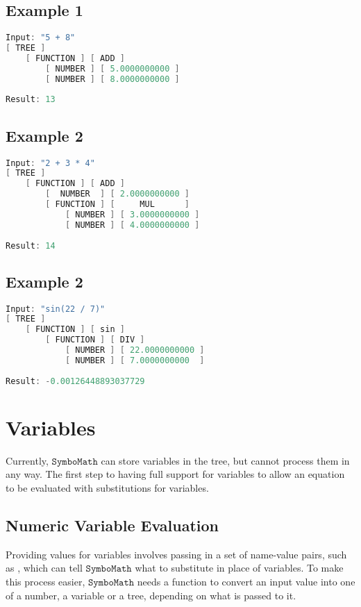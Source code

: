 \documentclass[12pt]{article}
\def\Symbo{{$\texttt{SymboMath}$}}
\begin{document}
\subsection{Example 1}
\begin{lstlisting}[language=C++]
Input: "5 + 8"
[ TREE ]
    [ FUNCTION ] [ ADD ]
        [ NUMBER ] [ 5.0000000000 ]
        [ NUMBER ] [ 8.0000000000 ]
        
Result: 13
\end{lstlisting}

\subsection{Example 2}
\begin{lstlisting}[language=C++]
Input: "2 + 3 * 4"
[ TREE ]
    [ FUNCTION ] [ ADD ]
        [  NUMBER  ] [ 2.0000000000 ]
        [ FUNCTION ] [     MUL      ]
            [ NUMBER ] [ 3.0000000000 ]
            [ NUMBER ] [ 4.0000000000 ]
            
Result: 14
\end{lstlisting}

\subsection{Example 2}
\begin{lstlisting}[language=C++]
Input: "sin(22 / 7)"
[ TREE ]
    [ FUNCTION ] [ sin ]
        [ FUNCTION ] [ DIV ]
            [ NUMBER ] [ 22.0000000000 ]
            [ NUMBER ] [ 7.0000000000  ]
            
Result: -0.00126448893037729 
\end{lstlisting}

\pagebreak

\section{Variables}

Currently, \Symbo{} can store variables in the tree, but cannot process them in any way. The first step to having full support for variables to allow an equation to be evaluated with substitutions for variables.

\subsection{Numeric Variable Evaluation}

Providing values for variables involves passing in a set of name-value pairs, such as , which can tell \Symbo{} what to substitute in place of variables. To make this process easier, \Symbo{} needs a function to convert an input value into one of a number, a variable or a tree, depending on what is passed to it.
\end{document}
